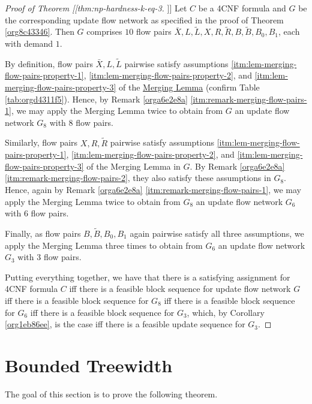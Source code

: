 \documentclass[fontsize=11pt,paper=a4]{book}
\begin{document}
\begin{proof}[Proof of Theorem [[thm:np-hardness-k-eq-3]]]
Let \(C\) be a 4CNF formula and \(G\) be the corresponding update flow network as specified in the proof of Theorem \ref{org8c43346}.
Then \(G\) comprises \(10\) flow pairs \(\bar{X},L,\tilde{L},X,R,\tilde{R},B,\tilde{B},B_0,B_1\), each with demand \(1\).

By definition, flow pairs \(\bar{X},L,\tilde{L}\) pairwise satisfy assumptions \ref{itm:lem-merging-flow-pairs-property-1}, \ref{itm:lem-merging-flow-pairs-property-2}, and \ref{itm:lem-merging-flow-pairs-property-3} of the \hyperref[org7dbdd46]{Merging Lemma} (confirm Table \ref{tab:orgd4311f5}).
Hence, by Remark \ref{orga6e2e8a} \ref{itm:remark-merging-flow-pairs-1}, we may apply the Merging Lemma twice to obtain from \(G\) an update flow network \(G_8\) with \(8\) flow pairs.

Similarly, flow pairs \(X,R,\tilde{R}\) pairwise satisfy assumptions \ref{itm:lem-merging-flow-pairs-property-1}, \ref{itm:lem-merging-flow-pairs-property-2}, and \ref{itm:lem-merging-flow-pairs-property-3} of the Merging Lemma in \(G\).
By Remark \ref{orga6e2e8a} \ref{itm:remark-merging-flow-pairs-2}, they also satisfy these assumptions in \(G_8\).
Hence, again by Remark \ref{orga6e2e8a} \ref{itm:remark-merging-flow-pairs-1}, we may apply the Merging Lemma twice to obtain from \(G_8\) an update flow network \(G_6\) with \(6\) flow pairs.

Finally, as flow pairs \(B,\tilde{B},B_0,B_1\) again pairwise satisfy all three assumptions, we apply the Merging Lemma three times to obtain from \(G_6\) an update flow network \(G_3\) with \(3\) flow pairs.

Putting everything together, we have that there is a satisfying assignment for 4CNF formula \(C\) iff there is a feasible block sequence for update flow network \(G\) iff there is a feasible block sequence for \(G_8\) iff there is a feasible block sequence for \(G_6\) iff there is a feasible block sequence for \(G_3\), which, by Corollary \ref{org1eb86ee}, is the case iff there is a feasible update sequence for \(G_3\).
\end{proof}

\part{Bounded Treewidth}
\label{sec:org4cbf782}

The goal of this section is to prove the following theorem.
\end{document}
